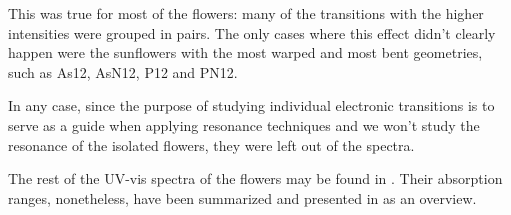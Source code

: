 This was true for most of the flowers: many of the transitions with the higher intensities were grouped in pairs.
The only cases where this effect didn't clearly happen were the sunflowers with the most warped and most bent geometries, such as As12, AsN12, P12 and PN12.

In any case, since the purpose of studying individual electronic transitions is to serve as a guide when applying resonance techniques and we won't study the resonance of the isolated flowers, they were left out of the spectra.

The rest of the UV-vis spectra of the flowers may be found in .
Their absorption ranges, nonetheless, have been summarized and presented in  as an overview.
